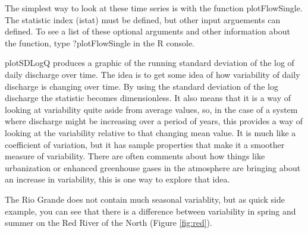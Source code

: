 \documentclass[a4paper,11pt]{article}
\begin{document}
\FloatBarrier

The simplest way to look at these time series is with the function plotFlowSingle. The statistic index (istat) must be defined, but other input arguements can defined. To see a list of these optional arguments and other information about the function, type ?plotFlowSingle in the R console. 

plotSDLogQ produces a graphic of the running standard deviation of the log of daily discharge over time.  The idea is to get some idea of how variability of daily discharge is changing over time.  By using the standard deviation of the log discharge the statistic becomes dimensionless.  It also means that it is a way of looking at variability quite aside from average values, so, in the case of a system where discharge might be increasing over a period of years, this provides a way of looking at the variability relative to that changing mean value.  It is much like a coefficient of variation, but it has sample properties that make it a smoother measure of variability.  There are often comments about how things like urbanization or enhanced greenhouse gases in the atmosphere are bringing about an increase in variability, this is one way to explore that idea.

The Rio Grande does not contain much seasonal variablity, but as quick side example, you can see that there is a difference between variability in spring and summer on the Red River of the North (Figure \ref{fig:red}).

\begin{Schunk}
\end{Schunk}
\end{document}
